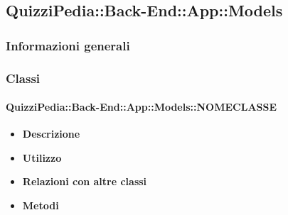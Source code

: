 \subsection{QuizziPedia::Back-End::App::Models}
\subsubsection{Informazioni generali}
\subsubsection{Classi}
\paragraph{QuizziPedia::Back-End::App::Models::NOMECLASSE}
\begin{itemize}
	\item \textbf{Descrizione} \\
	\item \textbf{Utilizzo} \\
	\item \textbf{Relazioni con altre classi} \\
	\item \textbf{Metodi} \\
\end{itemize}
